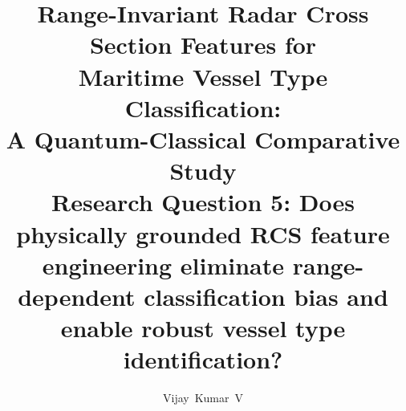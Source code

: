 \documentclass[journal]{IEEEtran}
\begin{document}
\graphicspath{{./figures/}}

\title{
  \textbf{Range-Invariant Radar Cross Section Features for\\
  Maritime Vessel Type Classification:\\
  A Quantum-Classical Comparative Study}\\[0.4em]
  \large Research Question 5: Does physically grounded RCS feature
  engineering eliminate range-dependent classification bias and
  enable robust vessel type identification?
}
\author{Vijay~Kumar~V%
}
\end{document}
